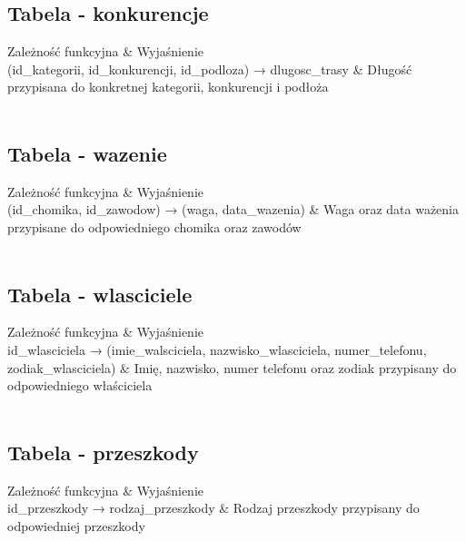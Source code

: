 \documentclass{article}
\begin{document}
\subsection{Tabela - konkurencje}

\begin{tcolorbox}[tab2,tabularx={X||X}]
Zależność funkcyjna & Wyjaśnienie     \\
\hline
\hline
(id\_kategorii, id\_konkurencji, id\_podloza) → dlugosc\_trasy & Długość przypisana do konkretnej kategorii, konkurencji i podłoża \\  \\    
\end{tcolorbox}

\subsection{Tabela - wazenie}

\begin{tcolorbox}[tab2,tabularx={X||X}]
Zależność funkcyjna & Wyjaśnienie     \\
\hline
\hline
(id\_chomika, id\_zawodow) → (waga, data\_wazenia) & Waga oraz data ważenia przypisane do odpowiedniego chomika oraz zawodów\\  \\    
\end{tcolorbox}

\subsection{Tabela - wlasciciele}

\begin{tcolorbox}[tab2,tabularx={X||X}]
Zależność funkcyjna & Wyjaśnienie     \\
\hline
\hline
id\_wlasciciela → (imie\_walsciciela, nazwisko\_wlasciciela, numer\_telefonu, zodiak\_wlasciciela) & Imię, nazwisko, numer telefonu oraz zodiak przypisany do odpowiedniego właściciela \\  \\    
\end{tcolorbox}

\subsection{Tabela - przeszkody}

\begin{tcolorbox}[tab2,tabularx={X||X}]
Zależność funkcyjna & Wyjaśnienie     \\
\hline
\hline
id\_przeszkody → rodzaj\_przeszkody & Rodzaj przeszkody przypisany do odpowiedniej przeszkody \\  \\    
\end{tcolorbox}
\end{document}
